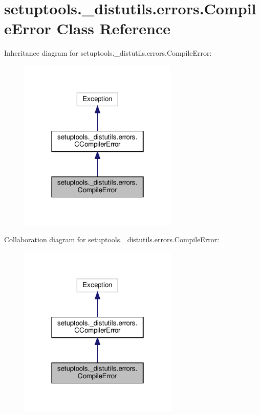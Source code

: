 \hypertarget{classsetuptools_1_1__distutils_1_1errors_1_1CompileError}{}\section{setuptools.\+\_\+distutils.\+errors.\+Compile\+Error Class Reference}
\label{classsetuptools_1_1__distutils_1_1errors_1_1CompileError}


Inheritance diagram for setuptools.\+\_\+distutils.\+errors.\+Compile\+Error\+:
\nopagebreak
\begin{figure}[H]
\begin{center}
\leavevmode
\includegraphics[width=214pt]{classsetuptools_1_1__distutils_1_1errors_1_1CompileError__inherit__graph}
\end{center}
\end{figure}


Collaboration diagram for setuptools.\+\_\+distutils.\+errors.\+Compile\+Error\+:
\nopagebreak
\begin{figure}[H]
\begin{center}
\leavevmode
\includegraphics[width=214pt]{classsetuptools_1_1__distutils_1_1errors_1_1CompileError__coll__graph}
\end{center}
\end{figure}


